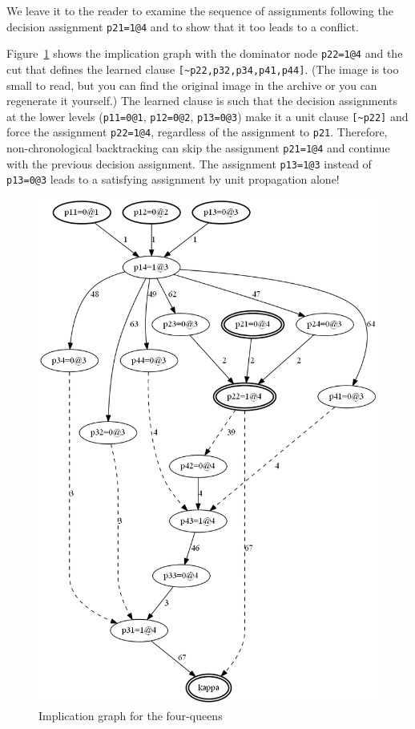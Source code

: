 \documentclass[11pt]{report}
\newcommand*{\p}[1]{\textup{\texttt{#1}}}
\begin{document}
We leave it to the reader to examine the sequence of assignments
following the decision assignment \p{p21=1@4} and to show that it too
leads to a conflict.

Figure~\ref{queens-ig} shows the implication graph with the dominator
node \verb+p22=1@4+ and the cut that defines the learned clause
\verb+[~p22,p32,p34,p41,p44]+. (The image is too small to read, but you
can find the original image in the archive or you can regenerate it
yourself.) The learned clause is such that the decision assignments at
the lower levels (\verb+p11=0@1+, \verb+p12=0@2+, \verb+p13=0@3+) make
it a unit clause \verb+[~p22]+ and force the assignment \p{p22=1@4},
regardless of the assignment to \p{p21}. Therefore, non-chronological
backtracking can skip the assignment \p{p21=1@4} and continue with the
previous decision assignment. The assignment \p{p13=1@3} instead of
\p{p13=0@3} leads to a satisfying assignment by unit propagation alone!
 
\begin{figure}[b]
\begin{center}
\includegraphics[keepaspectratio=true,height=.9\textheight]{queens-bw}
\end{center}
\caption{Implication graph for the four-queens}\label{queens-ig}
\end{figure}



\end{document}
